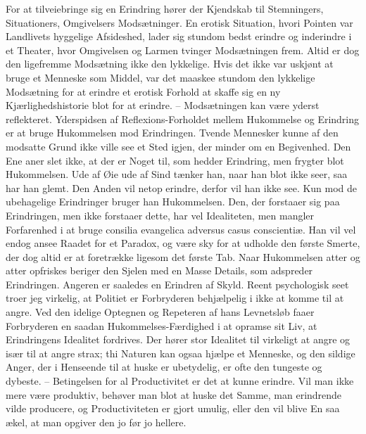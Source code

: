 \documentclass[12pt,a4paper]{article}
\begin{document}
For at tilveiebringe sig en Erindring hører der Kjendskab til Stemningers, Situationers, Omgivelsers Modsætninger. En erotisk Situation, hvori Pointen var Landlivets hyggelige Afsideshed, lader sig stundom bedst erindre og inderindre i et Theater, hvor Omgivelsen og Larmen tvinger Modsætningen frem. Altid er dog den ligefremme Modsætning ikke den lykkelige. Hvis det ikke var uskjønt at bruge et Menneske som Middel, var det maaskee stundom den lykkelige Modsætning for at erindre et erotisk Forhold at skaffe sig en ny Kjærlighedshistorie blot for at erindre. – Modsætningen kan være yderst reflekteret. Yderspidsen af Reflexions-Forholdet mellem Hukommelse og Erindring er at bruge Hukommelsen mod Erindringen. Tvende Mennesker kunne af den modsatte Grund ikke ville see et Sted igjen, der minder om en Begivenhed. Den Ene aner slet ikke, at der er Noget til, som hedder Erindring, men frygter blot Hukommelsen. Ude af Øie ude af Sind tænker han, naar han blot ikke seer, saa har han glemt. Den Anden vil netop erindre, derfor vil han ikke see. Kun mod de ubehagelige Erindringer bruger han Hukommelsen. Den, der forstaaer sig paa Erindringen, men ikke forstaaer dette, har vel Idealiteten, men mangler Forfarenhed i at bruge consilia evangelica adversus casus conscientiæ. Han vil vel endog ansee Raadet for et Paradox, og være sky for at udholde den første Smerte, der dog altid er at foretrække ligesom det første Tab. Naar Hukommelsen atter og atter opfriskes beriger den Sjelen med en Masse Details, som adspreder Erindringen. Angeren er saaledes en Erindren af Skyld. Reent psychologisk seet troer jeg virkelig, at Politiet er Forbryderen behjælpelig i ikke at komme til at angre. Ved den idelige Optegnen og Repeteren af hans Levnetsløb faaer Forbryderen en saadan Hukommelses-Færdighed i at opramse sit Liv, at Erindringens Idealitet fordrives. Der hører stor Idealitet til virkeligt at angre og især til at angre strax; thi Naturen kan ogsaa hjælpe et Menneske, og den sildige Anger, der i Henseende til at huske er ubetydelig, er ofte den tungeste og dybeste. – Betingelsen for al Productivitet er det at kunne erindre. Vil man ikke mere være produktiv, behøver man blot at huske det Samme, man erindrende vilde producere, og Productiviteten er gjort umulig, eller den vil blive En saa ækel, at man opgiver den jo før jo hellere.
\end{document}
